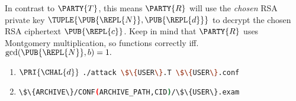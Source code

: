 
%
In contrast to 
$\PARTY{T}$, 
this means 
$\PARTY{R}$ 
will use the
{\em chosen} RSA private key $\TUPLE{ \PUB{\REPL{N}}, \PUB{\REPL{d}} }$ 
to decrypt the
     chosen  RSA  ciphertext $\PUB{\REPL{c}}$.
Keep in mind that $\PARTY{R}$ uses Montgomery multiplication, so functions
correctly iff. 
$
\gcd( \PUB{\REPL{N}}, b ) = 1 .
$



\begin{enumerate}
\item \DESCTASKIMPL
      {$\PRI{\CHAL{d}}$}
      {\mbox{\lstinline[language={bash}]|./attack \$\{USER\}.T \$\{USER\}.conf|}}
\item \DESCTASKEXAM
      {\mbox{\lstinline[language={bash}]|\$\{ARCHIVE\}/CONF(ARCHIVE_PATH,CID)/\$\{USER\}.exam|}}
\end{enumerate}


